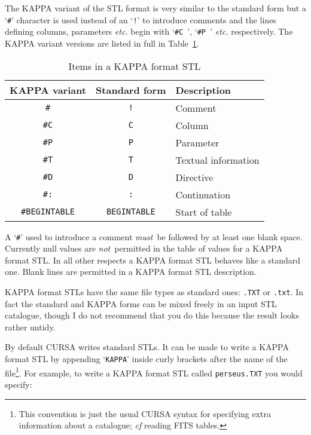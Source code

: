 \documentclass[twoside,11pt]{starlink}
\begin{document}
The KAPPA variant of the STL format is very similar to the standard
form but a `\texttt{\#}' character is used instead of an `\texttt{!}' to
introduce comments and the lines defining columns, parameters \emph{etc.}
begin with `\texttt{\#C~}', `\texttt{\#P~}' \emph{etc.} respectively.  The
KAPPA variant versions are listed in full in Table~\ref{KAP_ITEM}.

\begin{table}[htbp]

\begin{center}
\begin{tabular}{ccl}
KAPPA variant  &  Standard form & Description \\ \hline
\texttt{\#}        & \texttt{!}        & Comment \\
\texttt{\#C}       & \texttt{C}        & Column \\
\texttt{\#P}       & \texttt{P}        & Parameter \\
\texttt{\#T}       & \texttt{T}        & Textual information \\
\texttt{\#D}       & \texttt{D}        & Directive \\
\texttt{\#:}       & \texttt{:}        & Continuation \\
\texttt{\#BEGINTABLE} & \texttt{BEGINTABLE} & Start of table \\

\end{tabular}
\end{center}

\caption{\label{KAP_ITEM}Items in a KAPPA format STL}

\end{table}

A `\texttt{\#}' used to introduce a comment \textit{must}\, be followed by at
least one blank space.  Currently null values are \textit{not}\, permitted
in the table of values for a KAPPA format STL.  In all other respects a
KAPPA format STL behaves like a standard one.  Blank lines are permitted
in a KAPPA format STL description.

KAPPA format STLs have the same file types as standard ones: \texttt{.TXT}
or \texttt{.txt}.  In fact the standard and KAPPA forms can be mixed freely
in an input STL catalogue, though I do not recommend that you do this
because the result looks rather untidy.

By default CURSA writes standard STLs.  It can be made to write a KAPPA
format STL by appending `\texttt{KAPPA}' inside curly brackets after the
name of the file\footnote{This convention is just the usual CURSA
syntax for specifying extra information about a catalogue; \textit{cf}\/
reading FITS tables.}.  For example, to write a KAPPA format STL called
\texttt{perseus.TXT} you would specify:
\end{document}
